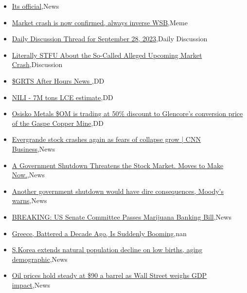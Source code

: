 \documentclass{article}%
\begin{document}
%
\begin{itemize}%
\item%
\href{https://reddit.com/r/wallstreetbets/comments/16ud2ex/its\_official/}{Its official},News%
\item%
\href{https://reddit.com/r/wallstreetbets/comments/16uctjm/market\_crash\_is\_now\_confirmed\_always\_inverse\_wsb/}{Market crash is now confirmed, always inverse WSB},Meme%
\item%
\href{https://reddit.com/r/wallstreetbets/comments/16ubth6/daily\_discussion\_thread\_for\_september\_28\_2023/}{Daily Discussion Thread for September 28, 2023},Daily Discussion%
\item%
\href{https://reddit.com/r/wallstreetbets/comments/16ubsth/literally\_stfu\_about\_the\_socalled\_alleged/}{Literally STFU About the So-Called Alleged Upcoming Market Crash},Discussion%
\item%
\href{https://reddit.com/r/Baystreetbets/comments/16u41lr/grts\_after\_hours\_news/}{\$GRTS After Hours News },DD%
\item%
\href{https://reddit.com/r/Baystreetbets/comments/16u3bed/nili\_7m\_tons\_lce\_estimate/}{NILI - 7M tons LCE estimate},DD%
\item%
\href{https://reddit.com/r/Baystreetbets/comments/16tp2hz/osisko\_metals\_om\_is\_trading\_at\_50\_discount\_to/}{Osisko Metals \$OM is trading at 50\% discount to Glencore's conversion price of the Gaspe Copper Mine},DD%
\item%
\href{https://reddit.com/r/StockMarket/comments/16tkgl6/evergrande\_stock\_crashes\_again\_as\_fears\_of/}{Evergrande stock crashes again as fears of collapse grow | CNN Business},News%
\item%
\href{https://reddit.com/r/StockMarket/comments/16teeci/a\_government\_shutdown\_threatens\_the\_stock\_market/}{A Government Shutdown Threatens the Stock Market. Moves to Make Now.},News%
\item%
\href{https://reddit.com/r/Economics/comments/16tmnzj/another\_government\_shutdown\_would\_have\_dire/}{Another government shutdown would have dire consequences, Moody's warns},News%
\item%
\href{https://reddit.com/r/Economics/comments/16tlu14/breaking\_us\_senate\_committee\_passes\_marijuana/}{BREAKING: US Senate Committee Passes Marijuana Banking Bill},News%
\item%
\href{https://reddit.com/r/Economics/comments/16tkuqt/greece\_battered\_a\_decade\_ago\_is\_suddenly\_booming/}{Greece, Battered a Decade Ago, Is Suddenly Booming},nan%
\item%
\href{https://reddit.com/r/Economics/comments/16tg5m5/skorea\_extends\_natural\_population\_decline\_on\_low/}{S.Korea extends natural population decline on low births, aging demographic},News%
\item%
\href{https://reddit.com/r/Economics/comments/16tfgbk/oil\_prices\_hold\_steady\_at\_90\_a\_barrel\_as\_wall/}{Oil prices hold steady at \$90 a barrel as Wall Street weighs GDP impact},News%
\end{itemize}%
\end{document}
